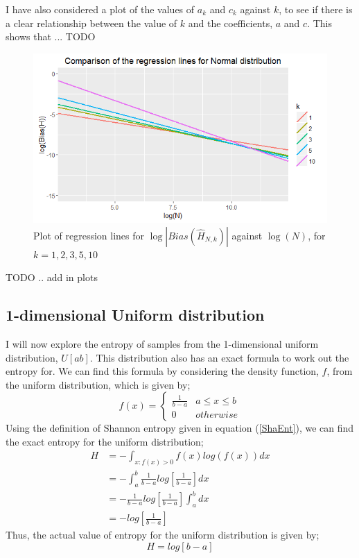 \documentclass{article}
\begin{document}
I have also considered a plot of the values of $a_{k}$ and $c_{k}$ against $k$, to see if there is a clear relationship between the value of $k$ and the coefficients, $a$ and $c$. This shows that ... TODO

\begin{figure}
  \begin{center}
    \includegraphics[width=\textwidth]{./Graphs/Normal_comparison.png}
  \end{center}
\caption{Plot of regression lines for $\log|Bias(\hat{H}_{N, k})|$ against $\log(N)$, for $k=1, 2, 3, 5, 10$}
  \label{normal_comparison_graph}
\end{figure}

TODO .. add in plots 





\subsection{1-dimensional Uniform distribution}

I will now explore the entropy of samples from the 1-dimensional uniform distribution, $U[a b]$. This distribution also has an exact formula to work out the entropy for. We can find this formula by considering the density function, $f$, from the uniform distribution, which is given by;
\[
f(x) =  \begin{cases} 
      \frac{1}{b-a} & a \leq x \leq b \\
      0 & otherwise
   \end{cases}
\]
Using the definition of Shannon entropy given in equation (\ref{ShaEnt}), we can find the exact entropy for the uniform distribution;
\begin{align*}
H &= - \int_{x : f(x) > 0} f(x) log(f(x)) dx \\ 
&= - \int_{a}^{b} \frac{1}{b-a} log \left[ \frac{1}{b-a} \right] dx  \\
&= - \frac{1}{b-a} log \left[ \frac{1}{b-a} \right]  \int_{a}^{b} dx  \\
&= -  log  \left[ \frac{1}{b-a} \right] 
\end{align*}
Thus, the actual value of entropy for the uniform distribution is given by;
\begin{equation} \label{UnifEnt}
H = log [ b-a ]
\end{equation}
\end{document}
